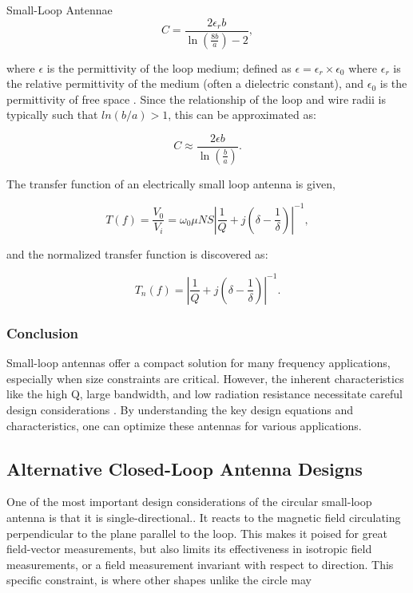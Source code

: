 \documentclass[12pt]{article}
\begin{document}
\begin{section} {Small-Loop Antennae}
\[
C = \frac{2 \epsilon_r b}{\ln\left(\frac{8b}{a}\right) - 2},
\]

where $\epsilon$ is the permittivity of the loop medium; defined as $ \epsilon = \epsilon_r \times \epsilon_0 $ where $\epsilon_r$ is the relative permittivity of the medium (often a dielectric constant), and $\epsilon_0$ is the permittivity of free space \cite{huang_antennas_2021}. Since the relationship of the loop and wire radii is typically such that $ln(b/a) > 1$, this can be approximated as:

\[
C \approx \frac{2 \epsilon b}{\ln \left( \frac{b}{a}\right)}.
\]

The transfer function of an electrically small loop antenna is given,

\[
T(f) = \frac{V_0}{V_i} = \omega_0 \mu N S \left| \frac{1}{Q} + j \left( \delta - \frac{1}{\delta} \right) \right|^{-1},
\]

and the normalized transfer function is discovered as:

\[
T_n(f) = \left| \frac{1}{Q} + j \left( \delta - \frac{1}{\delta} \right) \right|^{-1}.
\]

\subsubsection{Conclusion}

Small-loop antennas offer a compact solution for many frequency applications, especially when size constraints are critical. However, the inherent characteristics like the high Q, large bandwidth, and low radiation resistance necessitate careful design considerations . By understanding the key design equations and characteristics, one can optimize these antennas for various applications.

\subsection{Alternative Closed-Loop Antenna Designs}

One of the most important design considerations of the circular small-loop antenna is that it is single-directional.. It reacts to the magnetic field circulating perpendicular to the plane parallel to the loop. This makes it poised for great field-vector measurements, but also limits its effectiveness in isotropic field measurements, or a field measurement invariant with respect to direction. This specific constraint, is where other shapes unlike the circle may


\end{section}
\end{document}
